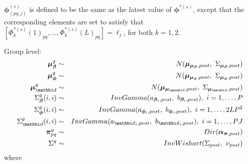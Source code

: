 \documentclass[12pt,titlepage,fleqn]{article}
\newcommand{\1}{{\bm 1}}
\newcommand{\vd}{\mathbi d}
\newcommand{\valpha}{\boldsymbol \alpha}
\newcommand{\vbeta}{\boldsymbol \beta}
\newcommand{\vphi}{\boldsymbol \phi}
\newcommand{\vell}{\boldsymbol \ell}
\newcommand{\vmu}{\boldsymbol{\mu}}
\newcommand{\vpi}{\boldsymbol{\pi}}
\newcommand{\s}{^{(s)}}
\newcommand{\sst}{^{*(s)}}
\begin{document}
$\vphi\s_{(pq,j)}$ is defined to be the same as the latest value of $\vphi\sst$, except that the corresponding elements are set to satisfy that $[\Phi_k\sst(1)_{pq}, \dots, \Phi_k\sst(L)_{pq}]=\vell_j$, for both $k=1,2$. 

Group level:
\begin{eqnarray}
\label{beta-group}
{\color{blue}\vmu_{\vbeta}^g} &\sim& N(\vmu_{\vmu_{\vbeta},post},~\Sigma_{\vmu_{\vbeta},post})\\
\label{phi-group}
{\color{blue}\vmu_{\vphi}^g} &\sim& N(\vmu_{\vmu_{\vphi},post},~\Sigma_{\vmu_{\vphi},post})\\
\label{d-group}
{\color{blue}\vmu_{\vd}^g} &\sim& N(\vmu_{\vmu_{\vd},post},~\Sigma_{\vmu_{\vd},post})\\
\label{sigbeta-group}
{\color{blue}\Sigma_{\vbeta}^g(i,i)} &\sim& InvGamma(a_{\vbeta_i,post},~b_{\vbeta_i,post}), ~ i =1, \dots, P\\
\label{sigphi-group}
{\color{blue}\Sigma_{\vphi}^g(i,i)} &\sim& InvGamma(a_{\vphi_i,post},~b_{\vphi_i,post}),~ i =1, \dots, 2LP^2\\
{\color{blue}\Sigma_{\vd}^g(i,i)} &\sim& InvGamma(a_{\vd_i,post}, ~b_{\vd_i,post}),~ i =1, \dots, PJ\\
\label{pi-group}
{\color{blue}\vpi_{pq}^g} &\sim& Dir(\valpha_{\vpi,post})\\
\label{omega-group}
{\color{blue}\Sigma^{g}} &\sim& InvWishart(\Sigma_{post}, ~\nu_{post}) 
\end{eqnarray}
where
\end{document}
